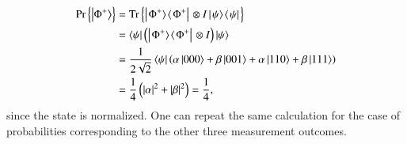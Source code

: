 \begin{solution}
\begin{enumerate}[label=(\alph*)]
    \begin{align*}
        \text{Pr}\left\{\left| \Phi^+ \right\rangle\right\} & = \text{Tr}\left\{ \left|\left. \Phi^+ \rangle\right.\!\langle\left. \Phi^+ \right|\right.  \otimes I \left|\left. \psi \rangle\right.\!\langle\left. \psi \right|\right.  \right\} \\
        & = \left\langle \psi \right| \left( \left|\left. \Phi^+ \rangle\right.\!\langle\left. \Phi^+ \right|\right. \otimes I \right) \left| \psi \right\rangle \\
        & = \frac{1}{2\sqrt{2}} \left\langle \psi \right| \left( \alpha\left| 000 \right\rangle + \beta\left| 001 \right\rangle + \alpha\left| 110 \right\rangle + \beta\left| 111 \right\rangle \right) \\
        & = \frac{1}{4} \left( |\alpha|^2 + |\beta|^2 \right) = \frac{1}{4},
    \end{align*}
    since the state \ket{\psi} is normalized.
    One can repeat the same calculation for the case of probabilities corresponding to the other three measurement outcomes.
\end{enumerate}
\end{solution}

